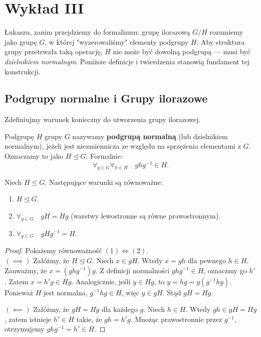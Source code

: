 \chapter{Wykład III}

\begin{intuition}
Łukaszu, zanim przejdziemy do formalizmu: grupę ilorazową $G/H$ rozumiemy jako grupę $G$, w której "wyzerowaliśmy" elementy podgrupy $H$. Aby struktura grupy przetrwała taką operację, $H$ nie może być dowolną podgrupą — musi być \textit{dzielnikiem normalnym}. Poniższe definicje i twierdzenia stanowią fundament tej konstrukcji.
\end{intuition}

\section{Podgrupy normalne i Grupy ilorazowe}

Zdefiniujmy warunek konieczny do utworzenia grupy ilorazowej.

\begin{definition}
Podgrupę $H$ grupy $G$ nazywamy \textbf{podgrupą normalną} (lub dzielnikiem normalnym), jeżeli jest niezmiennicza ze względu na sprzężenia elementami z $G$. Oznaczamy to jako $H \trianglelefteq G$. Formalnie:
\[ \forall_{g \in G} \forall_{h \in H} \quad ghg^{-1} \in H. \]
\end{definition}

\begin{theorem}
Niech $H \le G$. Następujące warunki są równoważne:
\begin{enumerate}
    \item $H \trianglelefteq G$.
    \item $\forall_{g \in G} \quad gH = Hg$ (warstwy lewostronne są równe prawostronnym).
    \item $\forall_{g \in G} \quad gHg^{-1} = H$.
\end{enumerate}
\end{theorem}

\begin{proof}
Pokażemy równoważność $(1) \iff (2)$.\\
$(\implies)$ Załóżmy, że $H \trianglelefteq G$. Niech $x \in gH$. Wtedy $x = gh$ dla pewnego $h \in H$.
Zauważmy, że $x = (ghg^{-1})g$. Z definicji normalności $ghg^{-1} \in H$, oznaczmy go $h'$. Zatem $x = h'g \in Hg$.
Analogicznie, jeśli $y \in Hg$, to $y = hg = g(g^{-1}hg)$. Ponieważ $H$ jest normalna, $g^{-1}hg \in H$, więc $y \in gH$.
Stąd $gH = Hg$.

$(\impliedby)$ Załóżmy, że $gH = Hg$ dla każdego $g$. Niech $h \in H$. Wtedy $gh \in gH = Hg$, zatem istnieje $h' \in H$ takie, że $gh = h'g$. Mnożąc prawostronnie przez $g^{-1}$, otrzymujemy $ghg^{-1} = h' \in H$.
\end{proof}

